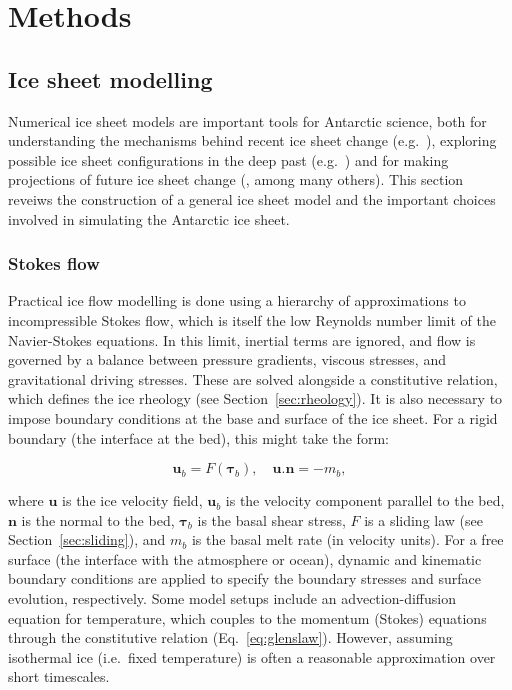\chapter{Methods}

\section{Ice sheet modelling}

Numerical ice sheet models are important tools for Antarctic science, both for understanding the mechanisms behind recent ice sheet change (e.g.~\citealt{payneRecentDramaticThinning2004,gudmundssonInstantaneousAntarcticIce2019,bradleyQuantifyingAttributingRole2025}), exploring possible ice sheet configurations in the deep past (e.g.~\citealt{deboerSimulatingAntarcticIce2015}) and for making projections of future ice sheet change (\citealt{seroussiISMIP6AntarcticaMultimodel2020,seroussiEvolutionAntarcticIce2024}, among many others). This section reveiws the construction of a general ice sheet model and the important choices involved in simulating the Antarctic ice sheet.

\subsection{Stokes flow}

\noindent
Practical ice flow modelling is done using a hierarchy of approximations to incompressible Stokes flow, which is itself the low Reynolds number limit of the Navier-Stokes equations. In this limit, inertial terms are ignored, and flow is governed by a balance between pressure gradients, viscous stresses, and gravitational driving stresses. These are solved alongside a constitutive relation, which defines the ice rheology (see Section~\ref{sec:rheology}). It is also necessary to impose boundary conditions at the base and surface of the ice sheet. For a rigid boundary (the interface at the bed), this might take the form:

\begin{equation}
    \mathbf{u}_b = F (\boldsymbol{\tau}_b), \quad \mathbf{u}.\mathbf{n} = -m_b,
\end{equation}

\noindent
where $\mathbf{u}$ is the ice velocity field, $\mathbf{u}_b$ is the velocity component parallel to the bed, $\mathbf{n}$ is the normal to the bed, $\boldsymbol{\tau}_b$ is the basal shear stress, $F$ is a sliding law (see Section~\ref{sec:sliding}), and $m_b$ is the basal melt rate (in velocity units). For a free surface (the interface with the atmosphere or ocean), dynamic and kinematic boundary conditions are applied to specify the boundary stresses and surface evolution, respectively. Some model setups include an advection-diffusion equation for temperature, which couples to the momentum (Stokes) equations through the constitutive relation (Eq.~\ref{eq:glenslaw}). However, assuming isothermal ice (i.e.~fixed temperature) is often a reasonable approximation over short timescales.

